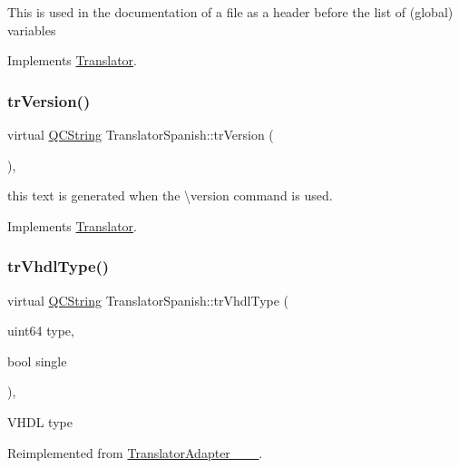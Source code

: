 This is used in the documentation of a file as a header before the list of (global) variables 

Implements \mbox{\hyperlink{class_translator}{Translator}}.

\mbox{\label{class_translator_spanish_a3909cfba65c60aea13702c9fe0c750d3}} 
\subsubsection{\texorpdfstring{trVersion()}{trVersion()}}
{\footnotesize\ttfamily virtual \mbox{\hyperlink{class_q_c_string}{Q\+C\+String}} Translator\+Spanish\+::tr\+Version (\begin{DoxyParamCaption}{ }\end{DoxyParamCaption})\hspace{0.3cm}{\ttfamily [inline]}, {\ttfamily [virtual]}}

this text is generated when the \textbackslash{}version command is used. 

Implements \mbox{\hyperlink{class_translator}{Translator}}.

\mbox{\label{class_translator_spanish_ae8474030d0a1661c6901b17ace1f781d}} 
\subsubsection{\texorpdfstring{trVhdlType()}{trVhdlType()}}
{\footnotesize\ttfamily virtual \mbox{\hyperlink{class_q_c_string}{Q\+C\+String}} Translator\+Spanish\+::tr\+Vhdl\+Type (\begin{DoxyParamCaption}\item[{uint64}]{type,  }\item[{bool}]{single }\end{DoxyParamCaption})\hspace{0.3cm}{\ttfamily [inline]}, {\ttfamily [virtual]}}

V\+H\+DL type 

Reimplemented from \mbox{\hyperlink{class_translator_adapter__1__8__15}{Translator\+Adapter\+\_\+\_\+\_}}.

\mbox{\label{class_translator_spanish_a4fc36568cb59e984945de10b059600d9}} 

